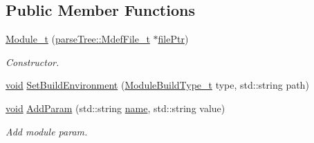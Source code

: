 \subsection*{Public Member Functions}
\begin{DoxyCompactItemize}
\item 
\hyperlink{structmodel_1_1_module__t_a8b887c65bbaa6ceb9b23e2f02babdc41}{Module\+\_\+t} (\hyperlink{structparse_tree_1_1_mdef_file__t}{parse\+Tree\+::\+Mdef\+File\+\_\+t} $\ast$\hyperlink{update_daemon_8c_acf1f3d914b42896a64e8683abe22ae7a}{file\+Ptr})
\begin{DoxyCompactList}\small\item\em Constructor. \end{DoxyCompactList}\item 
\hyperlink{_t_e_m_p_l_a_t_e__cdef_8h_ac9c84fa68bbad002983e35ce3663c686}{void} \hyperlink{structmodel_1_1_module__t_a2a53fa7067ca0599717306a58a46aa83}{Set\+Build\+Environment} (\hyperlink{structmodel_1_1_module__t_a6c9277eb6ec850a82742e5be2ff28b46}{Module\+Build\+Type\+\_\+t} type, std\+::string path)
\item 
\hyperlink{_t_e_m_p_l_a_t_e__cdef_8h_ac9c84fa68bbad002983e35ce3663c686}{void} \hyperlink{structmodel_1_1_module__t_a401051507449c328bfc3b2b28d9408ba}{Add\+Param} (std\+::string \hyperlink{structmodel_1_1_module__t_a74b8836c5f3fddefb1503c68b270595f}{name}, std\+::string value)
\begin{DoxyCompactList}\small\item\em Add module param. \end{DoxyCompactList}\end{DoxyCompactItemize}
